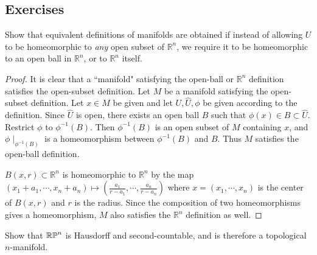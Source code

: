 \subsection{Exercises}
\begin{customexer}{1.1}\label{exercise_1_1}
  Show that equivalent definitions of manifolds are obtained if instead of allowing $U$ to be homeomorphic to \textit{any} open subset of $\mathbb{R}^n$, we require it to be homeomorphic to an open ball in $\mathbb{R}^n$, or to $\mathbb{R}^n$ itself.
\end{customexer}

\begin{proof}
  It is clear that a ``manifold" satisfying the open-ball or $\mathbb{R}^n$ definition satisfies the open-subset definition.
  Let $M$ be a manifold satisfying the open-subset definition.
  Let $x \in M$ be given and let $U, \hat{U}, \phi$ be given according to the definition.
  Since $\hat{U}$ is open, there exists an open ball $B$ such that $\phi(x) \in B \subset \hat{U}$.
  Restrict $\phi$ to $\phi^{-1}(B)$.
  Then $\phi^{-1}(B)$ is an open subset of $M$ containing $x$, and $\phi\mid_{\phi^{-1}(B)}$ is a homeomorphism between $\phi^{-1}(B)$ and $B$.
  Thus $M$ satisfies the open-ball definition.

  $B(x, r) \subset \mathbb{R}^n$ is homeomorphic to $\mathbb{R}^n$ by the map $(x_1 + a_1, \cdots, x_n + a_n) \mapsto (\frac{a_1}{r - a_1}, \cdots, \frac{a_n}{r - a_n})$ where $x = (x_1, \cdots, x_n)$ is the center of $B(x, r)$ and $r$ is the radius.
  Since the composition of two homeomorphisms gives a homeomorphism, $M$ also satisfies the $\mathbb{R}^n$ definition as well.
\end{proof}


\begin{customexer}{1.6}
  Show that $\operatorname{\mathbb{R}\mathbb{P}}^n$ is Hausdorff and second-countable, and is therefore a topological $n$-manifold.
\end{customexer}

